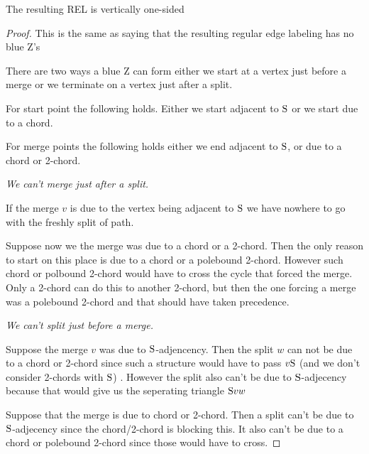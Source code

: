       \begin{lemma}
        \label{lm:sweep:vertOnsided}
        The resulting REL is vertically one-sided
      \end{lemma}
      \begin{proof}
        This is the same as saying that the resulting regular edge labeling has no blue Z's

        There are two ways a blue Z can form either we start at a vertex just before a merge or we terminate on a vertex just after a split.

        For start point the following holds. Either we start adjacent to $\mathrm{S}$ or we start due to a chord.

        For merge points the following holds either we end adjacent to $\mathrm{S}$, or due to a chord or 2-chord.

        \vspace{2ex}
        \emph{We can't merge just after a split.}

        If the merge $v$ is due to the vertex being adjacent to $\mathrm{S}$ we have nowhere to go with the freshly split of path. 

        Suppose now we the merge was due to a chord or a 2-chord. Then the only reason to start on this place is due to a chord or a polebound 2-chord. However such chord or polbound 2-chord would have to cross the cycle that forced the merge. Only a 2-chord can do this to another 2-chord, but then the one forcing a merge was a polebound 2-chord and that should have taken precedence.


        \vspace{2ex}
        \emph{We can't split just before a merge.}

        Suppose the merge $v$ was due to $\mathrm{S}$-adjencency. Then the split $w$ can not be due to a chord or 2-chord since such a structure would have to pass $v \mathrm{S}$ (and we don't consider 2-chords with $\mathrm{S}$) . However the split also can't be due to $\mathrm{S}$-adjecency because that would give us the seperating triangle $\mathrm{S} v w$

        Suppose that the merge is due to chord or 2-chord. Then a split can't be due to $\mathrm{S}$-adjecency since the chord/2-chord is blocking this. It also can't be due to a chord or polebound 2-chord since those would have to cross.

      \end{proof}



